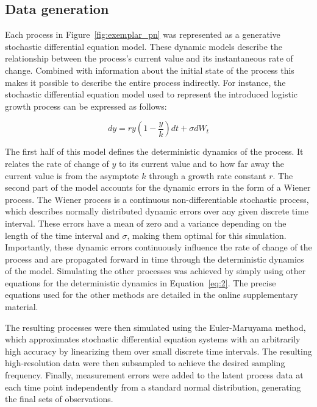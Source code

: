 \documentclass[man, floatsintext]{apa7}
\begin{document}
\subsection{Data generation}

Each process in Figure~\ref{fig:exemplar_pn} was represented as a generative
stochastic differential equation model. These dynamic models describe the
relationship between the process's current value and its instantaneous rate of
change. Combined with information about the initial state of the process this
makes it possible to describe the entire process indirectly. For instance, the
stochastic differential equation model used to represent the introduced
logistic growth process can be expressed as follows:

\begin{equation} \label{eq:2}
  dy = r y (1-\frac{y}{k})dt + \sigma dW_t
\end{equation}

\noindent The first half of this model defines the deterministic dynamics of
the process. It relates the rate of change of $y$ to its current value and to
how far away the current value is from the asymptote $k$ through a growth rate
constant $r$. The second part of the model accounts for the dynamic errors in
the form of a Wiener process. The Wiener process is a continuous
non-differentiable stochastic process, which describes normally distributed
dynamic errors over any given discrete time interval. These errors have a mean
of zero and a variance depending on the length of the time interval and
$\sigma$, making them optimal for this simulation. Importantly, these dynamic
errors continuously influence the rate of change of the process and are
propagated forward in time through the deterministic dynamics of the model.
Simulating the other processes was achieved by simply using other equations for
the deterministic dynamics in Equation~\ref{eq:2}. The precise equations used
for the other methods are detailed in the online supplementary material.

The resulting processes were then simulated using the Euler-Maruyama method,
which approximates stochastic differential equation systems with an arbitrarily
high accuracy by linearizing them over small discrete time intervals. The
resulting high-resolution data were then subsampled to achieve the desired
sampling frequency. Finally, measurement errors were added to the latent
process data at each time point independently from a standard normal
distribution, generating the final sets of observations.
\end{document}
